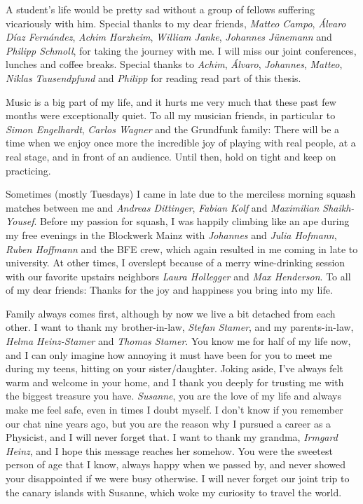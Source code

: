 A student's life would be pretty sad without a group of fellows suffering vicariously with him.
Special thanks to my dear friends, {\it Matteo Campo}, {\it Álvaro Díaz Fernández}, {\it Achim Harzheim}, {\it William Janke}, {\it Johannes Jünemann} and {\it Philipp Schmoll}, for taking the journey with me.
I will miss our joint conferences, lunches and coffee breaks.
Special thanks to {\it Achim}, {\it Álvaro}, {\it Johannes}, {\it Matteo}, {\it Niklas Tausendpfund} and {\it Philipp} for reading read part of this thesis.

Music is a big part of my life, and it hurts me very much that these past few months were exceptionally quiet.
To all my musician friends, in particular to {\it Simon Engelhardt}, {\it Carlos Wagner} and the Grundfunk family:
There will be a time when we enjoy once more the incredible joy of playing with real people, at a real stage, and in front of an audience.
Until then, hold on tight and keep on practicing.

Sometimes (mostly Tuesdays) I came in late due to the merciless morning squash matches between me and {\it Andreas Dittinger}, {\it Fabian Kolf} and {\it Maximilian Shaikh-Yousef}.
Before my passion for squash, I was happily climbing like an ape during my free evenings in the Blockwerk Mainz with {\it Johannes} and {\it Julia Hofmann}, {\it Ruben Hoffmann} and the BFE crew, which again resulted in me coming in late to university.
At other times, I overslept because of a merry wine-drinking session with our favorite upstairs neighbors {\it Laura Hollegger} and {\it Max Henderson}.
To all of my dear friends: Thanks for the joy and happiness you bring into my life.

Family always comes first, although by now we live a bit detached from each other.
I want to thank my brother-in-law, {\it Stefan Stamer}, and my parents-in-law, {\it Helma Heinz-Stamer} and {\it Thomas Stamer}.
You know me for half of my life now, and I can only imagine how annoying it must have been for you to meet me during my teens, hitting on your sister/daughter.
Joking aside, I've always felt warm and welcome in your home, and I thank you deeply for trusting me with the biggest treasure you have.
{\it Susanne}, you are the love of my life and always make me feel safe, even in times I doubt myself.
I don't know if you remember our chat nine years ago, but you are the reason why I pursued a career as a Physicist, and I will never forget that.
I want to thank my grandma, {\it Irmgard Heinz}, and I hope this message reaches her somehow.
You were the sweetest person of age that I know, always happy when we passed by, and never showed your disappointed if we were busy otherwise.
I will never forget our joint trip to the canary islands with Susanne, which woke my curiosity to travel the world.

